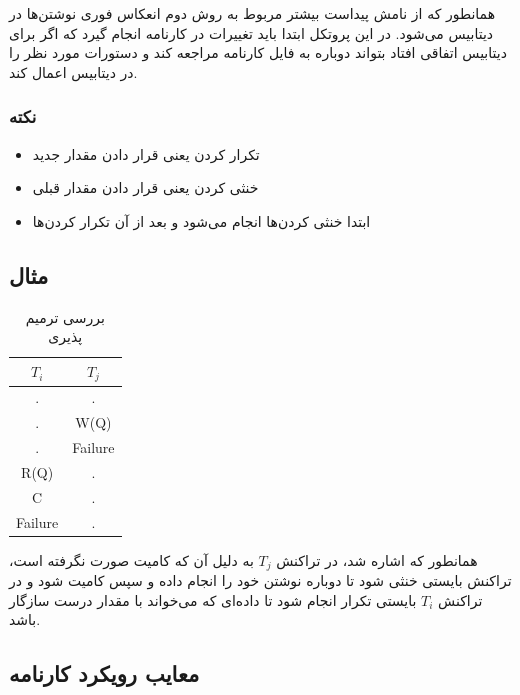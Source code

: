 همانطور که از نامش پیداست بیشتر مربوط به روش دوم انعکاس فوری نوشتن‌ها در دیتابیس
می‌شود. در این پروتکل ابتدا باید تغییرات در کارنامه انجام گیرد که اگر برای
دیتابیس اتفاقی افتاد بتواند دوباره به فایل کارنامه مراجعه کند و دستورات مورد نظر
را در دیتابیس اعمال کند.

\subsubsection*{نکته}

\begin{itemize}
    \item تکرار کردن یعنی قرار دادن مقدار جدید
    \item خنثی کردن یعنی قرار دادن مقدار قبلی
    \item ابتدا خنثی کردن‌ها انجام می‌شود و بعد از آن تکرار کردن‌ها
\end{itemize}


\subsection*{مثال}


\begin{LTR}
    \begin{table}[h]
        \centering
        \begin{RTL}
            \caption{بررسی ترمیم پذیری}
        \end{RTL}
        \begin{tabular}{c|c}
            $T_i$ & $T_j$ \\ \hline
            . & . \\
            . & W(Q) \\
            . & Failure \\
            R(Q) & . \\
            C & . \\
            Failure & . \\
        \end{tabular}
    \end{table}
\end{LTR}

همانطور که اشاره شد، در تراکنش $T_j$ به دلیل آن که کامیت صورت نگرفته است، تراکنش
بایستی خنثی شود تا دوباره نوشتن خود را انجام داده و سپس کامیت شود و در تراکنش
$T_i$ بایستی تکرار انجام شود تا داده‌ای که می‌خواند با مقدار درست سازگار باشد.

\subsection{معایب رویکرد کارنامه}

